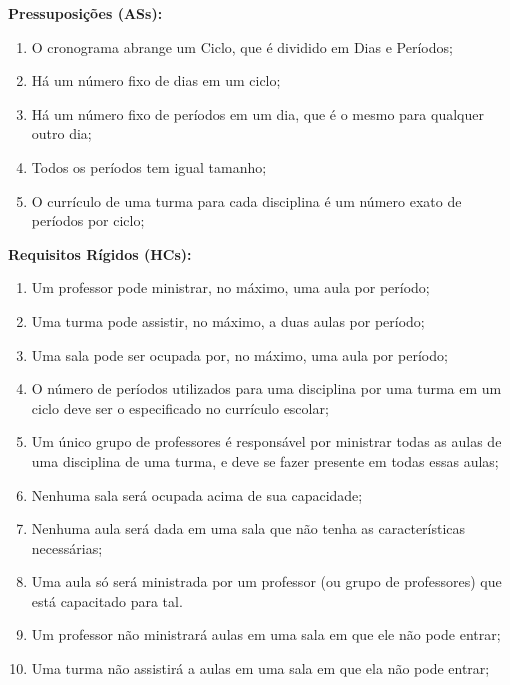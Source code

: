 \documentclass[12pt,a4paper]{article}
\begin{document}
			\textbf{Pressuposições (ASs):}
			\begin{enumerate}
				\item O cronograma abrange um Ciclo, que é dividido em Dias e Períodos;
				\item Há um número fixo de dias em um ciclo;
				\item Há um número fixo de períodos em um dia, que é o mesmo para qualquer outro dia;
				\item Todos os períodos tem igual tamanho;
				\item O currículo de uma turma para cada disciplina é um número exato de períodos por ciclo;
			\end{enumerate}

			\textbf{Requisitos Rígidos (HCs):}
			\begin{enumerate}
				\item Um professor pode ministrar, no máximo, uma aula por período;
				\item Uma turma pode assistir, no máximo, a duas aulas por período;
				\item Uma sala pode ser ocupada por, no máximo, uma aula por período;
				\item O número de períodos utilizados para uma disciplina por uma turma em um ciclo deve ser o especificado no currículo escolar;
				\item Um único grupo de professores é responsável por ministrar todas as aulas de uma disciplina de uma turma, e deve se fazer presente em todas essas aulas;
				\item Nenhuma sala será ocupada acima de sua capacidade;
				\item Nenhuma aula será dada em uma sala que não tenha as características necessárias;
				\item Uma aula só será ministrada por um professor (ou grupo de professores) que está capacitado para tal.
				\item Um professor não ministrará aulas em uma sala em que ele não pode entrar;
				\item Uma turma não assistirá a aulas em uma sala em que ela não pode entrar;
			\end{enumerate}
\end{document}
